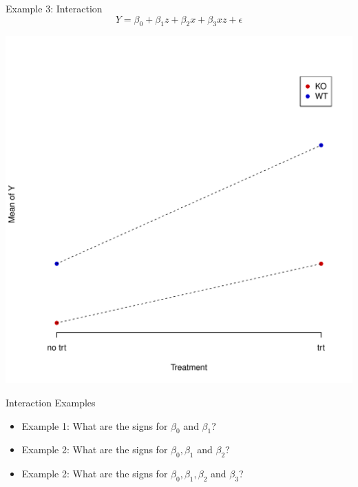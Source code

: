 \documentclass[xcolor=x11names,compress]{beamer}\usepackage[]{graphicx}\usepackage[]{color}
\newenvironment{knitrout}{}{} %
\begin{document}
\begin{frame}{Example 3: Interaction}
   \begin{equation*}
    Y=\beta_0 + \beta_1 z + \beta_2 x + \beta_3 xz +  \epsilon
  \end{equation*}
\begin{knitrout}\tiny
{}\color{fgcolor}

{\centering \includegraphics[width=.6\linewidth]{figure/beamer-unnamed-chunk-94-1} 

}



\end{knitrout}
\end{frame}


\begin{frame}{Interaction Examples}
  \begin{itemize}
  \item Example 1: What are the signs for $\beta_0$ and $\beta_1$?
  \item Example 2: What are the signs for $\beta_0, \beta_1$ and $\beta_2$?
  \item Example 2: What are the signs for $\beta_0, \beta_1, \beta_2$ and $\beta_3$?
  \end{itemize}
\end{frame}
\end{document}
